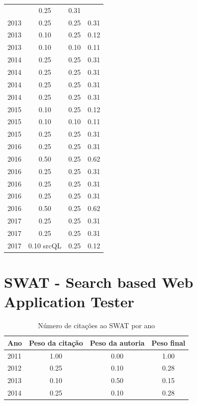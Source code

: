\begin{table}[H]
\begin{tabular}{| l | c | c | c |}
    & 0.25
    & {\color{red} 0.31} \\
  2013
    & 0.25
    & 0.25
    & {\color{red} 0.31} \\
  2013
    & 0.10
    & 0.25
    & {\color{red} 0.12} \\
  2013
    & 0.10
    & 0.10
    & {\color{red} 0.11} \\
\hline
  2014
    & 0.25
    & 0.25
    & {\color{red} 0.31} \\
  2014
    & 0.25
    & 0.25
    & {\color{red} 0.31} \\
  2014
    & 0.25
    & 0.25
    & {\color{red} 0.31} \\
  2014
    & 0.25
    & 0.25
    & {\color{red} 0.31} \\
\hline
  2015
    & 0.10
    & 0.25
    & {\color{red} 0.12} \\
  2015
    & 0.10
    & 0.10
    & {\color{red} 0.11} \\
  2015
    & 0.25
    & 0.25
    & {\color{red} 0.31} \\
\hline
  2016
    & 0.25
    & 0.25
    & {\color{red} 0.31} \\
  2016
    & 0.50
    & 0.25
    & {\color{blue} 0.62} \\
  2016
    & 0.25
    & 0.25
    & {\color{red} 0.31} \\
  2016
    & 0.25
    & 0.25
    & {\color{red} 0.31} \\
  2016
    & 0.25
    & 0.25
    & {\color{red} 0.31} \\
  2016
    & 0.50
    & 0.25
    & {\color{blue} 0.62} \\
\hline
  2017
    & 0.25
    & 0.25
    & {\color{red} 0.31} \\
  2017
    & 0.25
    & 0.25
    & {\color{red} 0.31} \\
  2017
    & 0.10
          {\tiny srcQL}
    & 0.25
    & {\color{red} 0.12} \\
\hline
\end{tabular}
\end{table}
\section{SWAT - Search based Web Application Tester}
\begin{table}[H]
\caption{Número de citações ao SWAT  por ano}
\centering
\begin{tabular}{| l | c | c | c |}
  \hline
  Ano & Peso da citação & Peso da autoria & Peso final \\
  \hline
  2011
    & 1.00
    & 0.00
    & {\color{blue} 1.00} \\
\hline
  2012
    & 0.25
    & 0.10
    & {\color{red} 0.28} \\
\hline
  2013
    & 0.10
    & 0.50
    & {\color{red} 0.15} \\
\hline
  2014
    & 0.25
    & 0.10
    & {\color{red} 0.28} \\
\hline
\end{tabular}
\end{table}
